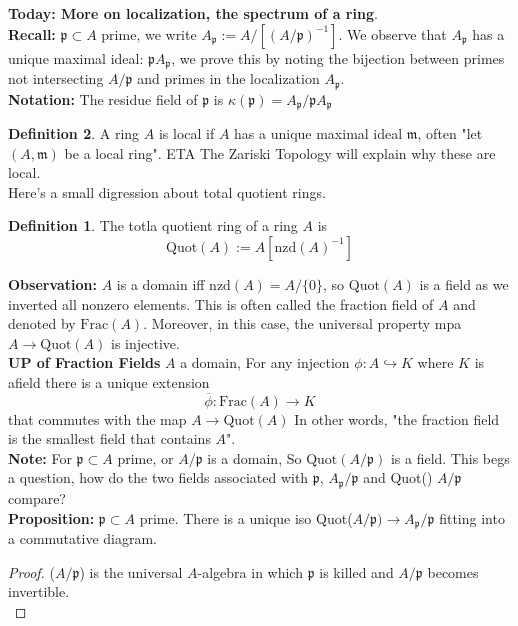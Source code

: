 \documentclass{article}
\theoremstyle{definition}
\theoremstyle{definition}
\newtheorem{definition}{Definition}[section]
\theoremstyle{remark}
\newcommand{\mk}[1]{\mathfrak{#1}}
\begin{document}
\textbf{Today: More on localization, the spectrum of a ring}.\\

\textbf{Recall:} $\mk{p} \subset A$ prime, we write $A_{\mk{p}} := A/[(A/ \mk{p})^{-1}]$.
We observe that $A_{\mk{p}}$ has a unique maximal ideal: $\mk{p} A_{\mk{p}}$, we prove this by noting the bijection between primes not intersecting $A/\mk{p}$ and primes in the localization $A_{\mk{p}}$.\\

\textbf{Notation:} The residue field of $\mk{p}$ is $\kappa(\mk{p}) = A_{\mk{p}}/\mk{p}A_{\mk{p}}$

\begin{definition}
	A ring $A$ is local if $A$ has a unique maximal ideal $\mk{m}$, often  "let $(A, \mk{m})$ be a local ring". ETA The Zariski Topology will explain why these are local. \\

	Here's a small digression about total quotient rings.
\begin{definition}
	The totla quotient ring of a ring $A$ is 
	\[\text{Quot}(A) := A[\text{nzd}(A)^{-1}]\]
\end{definition}

\textbf{Observation:} $A$ is a domain iff $\text{nzd}(A) = A/\{0\}$, so $\text{Quot}(A)$ is a field as we inverted all nonzero elements.
This is often called the fraction field of $A$ and denoted by $\text{Frac}(A)$.
Moreover, in this case, the universal property mpa $A \to \text{Quot}(A)$ is injective.\\

\textbf{UP of Fraction Fields} $A$ a domain, For any injection $\phi: A \hookrightarrow K$ where $K$ is afield there is a unique extension
\[\overline{\phi}: \text{Frac}(A) \to K\]
that commutes with the map $A \to \text{Quot}(A)$
In other words, "the fraction field is the smallest field that contains $A$".\\

\textbf{Note:} For $\mk{p} \subset A$ prime, or $A/\mk{p}$ is a domain, So $\text{Quot}(A/\mk{p})$ is a field. 
This begs a question, how do the two fields associated with $\mk{p}$, $A_{\mk{p}}/\mk{p}$ and Quot()
$A/\mk{p}$ compare?\\

\textbf{Proposition: }$\mk{p} \subset A$ prime.
There is a unique iso Quot($A/\mk{p}) \to A_{\mk{p}}/\mk{p}$ fitting into a commutative diagram.\\

\begin{proof}
	($A/\mk{p}$) is the universal $A$-algebra in which $\mk{p}$ is killed and $A/\mk{p}$ becomes invertible.\\


\end{proof}
\end{definition}
\end{document}
